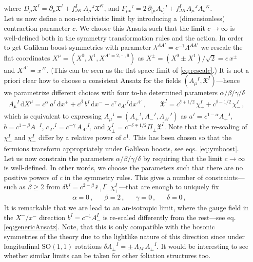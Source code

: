 \documentclass[a4paper,10pt,openany]{article}
\def\rmd{\mathrm{d}}
\begin{document}
	where $D_\mu\mathfrak X^I = \partial_\mu\mathfrak X^I + f_{JK}^I\,A_\mu{}^J\mathfrak X^K$, and $F_{\mu\nu}{}^I = 2\,\partial_{[\mu}A_{\nu]}{}^I + f^I_{JK}A_\mu{}^J A_\nu{}^K$. \\
	Let us now define a non-relativistic limit by introducing a (dimensionless) contraction parameter $c$. We choose this Ansatz such that the limit $c\to\infty$ is well-defined both in the symmetry transformation rules and the action. In order to get Galilean boost symmetries with parameter $\lambda^{AA'}=c^{-1}\Lambda^{AA'}$ we rescale the flat coordinates $X^\mu = (X^0,X^1,X^{A'=2,\cdots,9})$ as $X^\pm = (X^0\pm X^1)/\sqrt 2 = c\,x^\pm$ and $X^{A'}=x^{A'}$. (This can be seen as the flat space limit of \eqref{eq:rescale}.) It is not a priori clear how to choose a consistent Ansatz for the fields $(A_\mu{}^I,\mathfrak X^I)$---hence we parametrize different choices with four to-be determined parameters $\alpha/\beta/\gamma/\delta$
	\begin{align}\label{eq:genericAnsatz}
		A_\mu{}^I\,\rmd X^\mu = c^\alpha\,a^I\,\rmd x^+ + c^\beta\,b{}^I\,\rmd x^- + c^\gamma\,c_{A'}{}^I\rmd x^{A'}\,,\qquad \mathfrak X^I = c^{\delta + 1/2}\,\chi_+^I + c^{\delta-1/2}\,\chi_-^I\,,
	\end{align}
	which is equivalent to expressing $A_\mu{}^I = (A_+{}^I,A_-{}^I,A_{A'}{}^I)$ as $a^I = c^{1-\alpha}A_+{}^I$, $b=c^{1-\beta}A_-{}^I$, $c_{A'}{}^I = c^{-\gamma}\,A_{A'}{}^I$, and $\chi_\pm^I = c^{-\delta\mp 1/2}\Pi_{\pm}\mathfrak X^I$. Note that the re-scaling of $\chi_+^I$ and $\chi_-^I$ differ by a relative power of $c^1$. This has been chosen so that the fermions transform appropriately under Galilean boosts, see eqs. \eqref{eq:ymboost}.\\
	Let us now constrain the parameters $\alpha/\beta/\gamma/\delta$ by requiring that the limit $c\to\infty$ is well-defined. In other words, we choose the parameters such that there are no positive powers of $c$ in the symmetry rules. This gives a number of constraints---such as $\beta\geq 2$ from $\delta b^I = c^{2-\beta}\,\bar\epsilon_+\Gamma_-\chi_+^I$---that are enough to uniquely fix
	\begin{align}\label{eq:parchoice}
		&\alpha =0\,, &&\beta = 2\,, && \gamma=0\,, &&\delta =0\,,
	\end{align}
	It is remarkable that we are lead to an an-isotropic limit, where the gauge field in the $X^-/x^-$ direction $b^I = c^{-1} A_-^I$ is re-scaled differently from the rest---see eq. \eqref{eq:genericAnsatz}. Note, that this is only compatible with the bosonic symmetries of the theory due to the lightlike nature of this direction since under longitudinal $\mathrm{SO}(1,1)$ rotations $\delta A_\pm{}^I = \pm\,\Lambda_M\,A_\pm{}^I$. It would be interesting to see whether similar limits can be taken for other foliation structures too.\\
\end{document}
